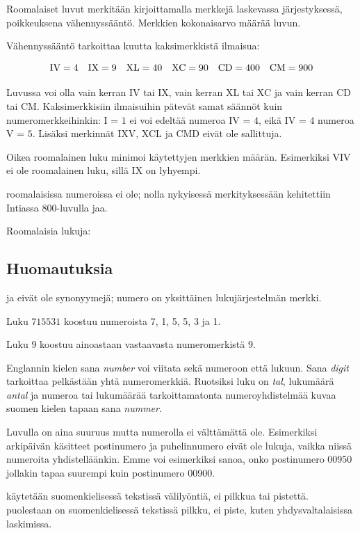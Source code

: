 Roomalaiset luvut merkitään kirjoittamalla merkkejä laskevassa järjestyksessä, poikkeuksena vähennyssääntö. Merkkien kokonaisarvo määrää luvun.

Vähennyssääntö tarkoittaa kuutta kaksimerkkistä ilmaisua:

\begin{equation*}
	\rm IV=4\quad
	IX=9\quad
	XL=40\quad
	XC=90\quad
	CD=400\quad
	CM=900
\end{equation*}

Luvussa voi olla vain kerran IV tai IX, vain kerran XL tai XC ja vain kerran CD tai CM.
Kaksimerkkisiin ilmaisuihin pätevät samat säännöt kuin numeromerkkeihinkin: I = $1$ ei voi edeltää numeroa IV = $4$, eikä IV = $4$ numeroa V = $5$.
Lisäksi merkinnät IXV, XCL ja CMD eivät ole sallittuja.

Oikea roomalainen luku minimoi käytettyjen merkkien määrän. Esimerkiksi VIV ei ole roomalainen luku, sillä IX on lyhyempi.

 roomalaisissa numeroissa ei ole; nolla nykyisessä merkityksessään kehitettiin Intiassa 800-luvulla jaa.

\begin{esimerkki}
	Roomalaisia lukuja:
	\begin{alakohdat}
	\end{alakohdat}
\end{esimerkki}

\subsection*{Huomautuksia}

 ja  eivät ole synonyymejä; numero on yksittäinen lukujärjestelmän merkki.

\begin{esimerkki}
	Luku $715531$ koostuu numeroista 7, 1, 5, 5, 3 ja 1.
	
	Luku $9$ koostuu ainoastaan vastaavasta numeromerkistä 9.
\end{esimerkki}

Englannin kielen sana \textit{number} voi viitata sekä numeroon että lukuun.
Sana \textit{digit} tarkoittaa pelkästään yhtä numeromerkkiä.
Ruotsiksi luku on \textit{tal}, lukumäärä \textit{antal} ja numeroa tai lukumäärää tarkoittamatonta numeroyhdistelmää kuvaa suomen kielen tapaan sana \textit{nummer}.

Luvulla on aina suuruus mutta numerolla ei välttämättä ole. Esimerkiksi arkipäivän käsitteet postinumero ja puhelinnumero eivät ole lukuja, vaikka niissä numeroita yhdistelläänkin. 
Emme voi esimerkiksi sanoa, onko postinumero 00950 jollakin tapaa suurempi kuin postinumero 00900.

 käytetään suomenkielisessä tekstissä välilyöntiä, ei pilkkua tai pistettä.
 puolestaan on suomenkielisessä tekstissä pilkku, ei piste, kuten yhdysvaltalaisissa laskimissa.
